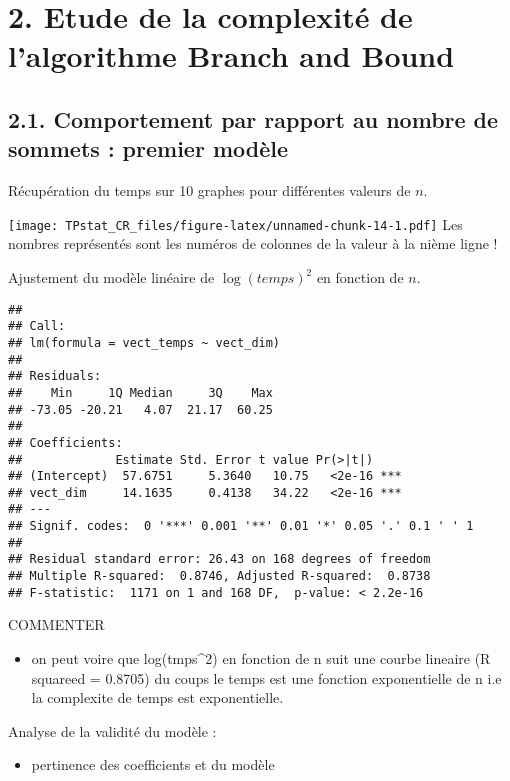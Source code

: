 \documentclass[]{article}
\providecommand{\tightlist}{%
  \setlength{\itemsep}{0pt}\setlength{\parskip}{0pt}}
\begin{document}
\hypertarget{etude-de-la-complexituxe9-de-lalgorithme-branch-and-bound}{%
\section{2. Etude de la complexité de l'algorithme Branch and
Bound}\label{etude-de-la-complexituxe9-de-lalgorithme-branch-and-bound}}

\hypertarget{comportement-par-rapport-au-nombre-de-sommets-premier-moduxe8le}{%
\subsection{2.1. Comportement par rapport au nombre de sommets : premier
modèle}\label{comportement-par-rapport-au-nombre-de-sommets-premier-moduxe8le}}

Récupération du temps sur 10 graphes pour différentes valeurs de \(n\).

\texttt{[image: TPstat\_CR\_files/figure-latex/unnamed-chunk-14-1.pdf]}
Les nombres représentés sont les numéros de colonnes de la valeur à la
nième ligne !

Ajustement du modèle linéaire de \(\log(temps)^2\) en fonction de \(n\).

\begin{verbatim}
## 
## Call:
## lm(formula = vect_temps ~ vect_dim)
## 
## Residuals:
##    Min     1Q Median     3Q    Max 
## -73.05 -20.21   4.07  21.17  60.25 
## 
## Coefficients:
##             Estimate Std. Error t value Pr(>|t|)    
## (Intercept)  57.6751     5.3640   10.75   <2e-16 ***
## vect_dim     14.1635     0.4138   34.22   <2e-16 ***
## ---
## Signif. codes:  0 '***' 0.001 '**' 0.01 '*' 0.05 '.' 0.1 ' ' 1
## 
## Residual standard error: 26.43 on 168 degrees of freedom
## Multiple R-squared:  0.8746, Adjusted R-squared:  0.8738 
## F-statistic:  1171 on 1 and 168 DF,  p-value: < 2.2e-16
\end{verbatim}

COMMENTER

\begin{itemize}
\tightlist
\item
  on peut voire que log(tmps\^{}2) en fonction de n suit une courbe
  lineaire (R squareed = 0.8705) du coups le temps est une fonction
  exponentielle de n i.e la complexite de temps est exponentielle.
\end{itemize}

Analyse de la validité du modèle :

\begin{itemize}
\tightlist
\item
  pertinence des coefficients et du modèle
\end{itemize}
\end{document}
